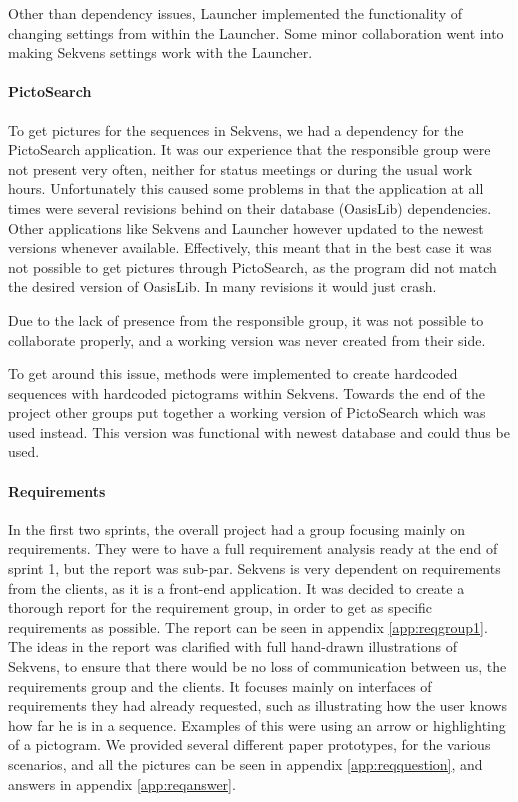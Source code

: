 Other than dependency issues, Launcher implemented the functionality of changing settings from within the Launcher. Some minor collaboration went into making Sekvens settings work with the Launcher.

\paragraph{PictoSearch}
To get pictures for the sequences in Sekvens, we had a dependency for the PictoSearch application. It was our experience that the responsible group were not present very often, neither for status meetings or during the usual work hours. Unfortunately this caused some problems in that the application at all times were several revisions behind on their database (OasisLib) dependencies. Other applications like Sekvens and Launcher however updated to the newest versions whenever available. Effectively, this meant that in the best case it was not possible to get pictures through PictoSearch, as the program did not match the desired version of OasisLib. In many revisions it would just crash.

Due to the lack of presence from the responsible group, it was not possible to collaborate properly, and a working version was never created from their side.

To get around this issue, methods were implemented to create hardcoded sequences with hardcoded pictograms within Sekvens. Towards the end of the project other groups put together a working version of PictoSearch which was used instead. This version was functional with newest database and could thus be used.

\paragraph{Requirements}
In the first two sprints, the overall project had a group focusing mainly on requirements. They were to have a full requirement analysis ready at the end of sprint 1, but the report was sub-par. Sekvens is very dependent on requirements from the clients, as it is a front-end application. It was decided to create a thorough report for the requirement group, in order to get as specific requirements as possible. The report can be seen in appendix \ref{app:reqgroup1}. The ideas in the report was clarified with full hand-drawn illustrations of Sekvens, to ensure that there would be no loss of communication between us, the requirements group and the clients. It focuses mainly on interfaces of requirements they had already requested, such as illustrating how the user knows how far he is in a sequence. Examples of this were using an arrow or highlighting of a pictogram. We provided several different paper prototypes, for the various scenarios, and all the pictures can be seen in appendix \ref{app:reqquestion}, and answers in appendix \ref{app:reqanswer}.